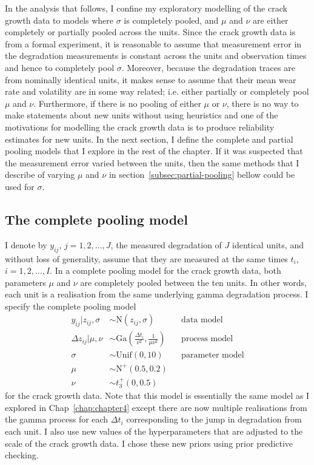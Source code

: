 In the analysis that follows, I confine my exploratory modelling of the crack growth data to models where $\sigma$ is completely pooled, and $\mu$ and $\nu$ are either completely or partially pooled across the units. Since the crack growth data is from a formal experiment, it is reasonable to assume that measurement error in the degradation measurements is constant across the units and observation times and hence to completely pool $\sigma$. Moreover, because the degradation traces are from nominally identical units, it makes sense to assume that their mean wear rate and volatility are in some way related; i.e. either partially or completely pool $\mu$ and $\nu$. Furthermore, if there is no pooling of either $\mu$ or $\nu$, there is no way to make statements about new units without using heuristics and one of the motivations for modelling the crack growth data is to produce reliability estimates for new units. In the next section, I define the complete and partial pooling models that I explore in the rest of the chapter. If it was suspected that the measurement error varied between the units, then the same methods that I describe of varying $\mu$ and $\nu$ in section~\ref{subsec:partial-pooling} bellow could be used for $\sigma$.

\subsection{The complete pooling model}
\label{subsec:complete-pooling}

I denote by $y_{ij}$, $j = 1, 2, \ldots, J$, the measured degradation of $J$ identical units, and without loss of generality, assume that they are measured at the same times $t_i$, $i = 1, 2, \ldots, I$. In a complete pooling model for the crack growth data, both parameters $\mu$ and $\nu$ are completely pooled between the ten units. In other words, each unit is a realisation from the same underlying gamma degradation process. I specify the complete pooling model 
\begin{align*} 
   y_{ij}|z_{ij}, \sigma & \sim \mbox{N}(z_{ij}, \sigma) && \mbox{data model} \\
   \Delta z_{ij}|\mu, \nu & \sim \mbox{Ga} \left( \frac{\Delta t_{i}}{\nu^2}, \frac{1}{\mu \nu^2} \right) && \mbox{process model} \\
   \sigma & \sim \mbox{Unif}(0, 10) && \mbox{parameter model} \\
   \mu & \sim \mbox{N}^{+}(0.5, 0.2) \\
   \nu & \sim t^{+}_3(0, 0.5)
\end{align*}
for the crack growth data. Note that this model is essentially the same model as I explored in Chap~\ref{chap:chapter4} except there are now multiple realisations from the gamma process for each $\Delta t_{i}$ corresponding to the jump in degradation from each unit. I also use new values of the hyperparameters that are adjusted to the scale of the crack growth data. I chose these new priors using prior predictive checking.

